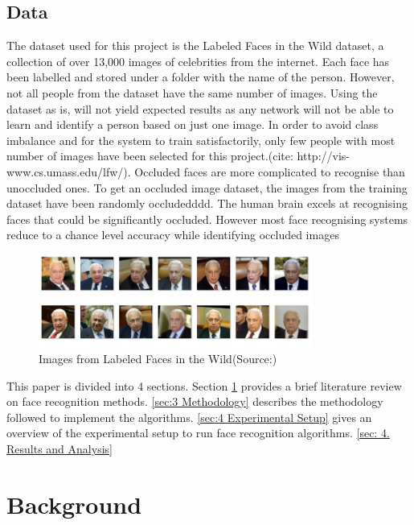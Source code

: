 \documentclass[conference]{IEEEtran}
\begin{document}
\subsection{Data} 
\label{subsec: 1c.Data}
The dataset used for this project is the Labeled Faces in the Wild dataset, a collection of over 13,000 images of celebrities from the internet. Each face has been labelled and stored under a folder with the name of the person. However, not all people from the dataset have the same number of images. Using the dataset as is, will not yield expected results as any network will not be able to learn and identify a person based on just one image. In order to avoid class imbalance and for the system to train satisfactorily, only few people with most number of images have been selected for this project.(cite: http://vis-www.cs.umass.edu/lfw/). Occluded faces are more complicated to recognise than unoccluded ones. To get an occluded image dataset, the images from the training dataset have been randomly occludedddd. The human brain excels at recognising faces that could be significantly occluded. However most face recognising systems reduce to a chance level accuracy while identifying occluded images

\begin{figure}[h!]
 \centering
 \includegraphics[width = 9cm]{dataset.JPG}
  \caption{ Images from Labeled Faces in the Wild(Source:\cite{LFWTech})}
 \label{fig 1: dataset}
\end{figure}

This paper is divided into 4 sections. Section \ref{sec: 2.Background} provides a brief literature review on face recognition methods. \ref{sec:3 Methodology} describes the methodology followed to implement the algorithms. \ref{sec:4 Experimental Setup} gives an overview of the experimental setup to run face recognition algorithms. \ref{sec: 4. Results and Analysis}

\section{Background}
\label{sec: 2.Background}
\end{document}

